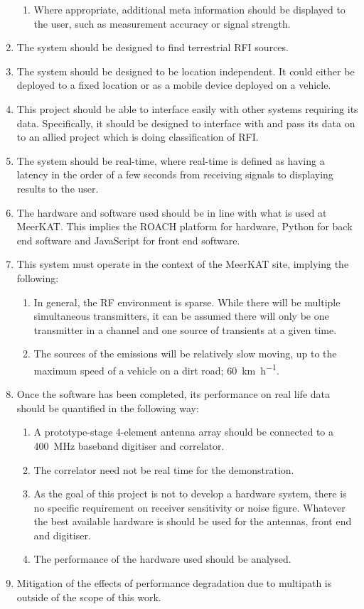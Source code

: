 \begin{enumerate}
\begin{enumerate}
      \item Where appropriate, additional meta information should be displayed to the user, such as measurement accuracy or signal strength.
    \end{enumerate}
  \item The system should be designed to find terrestrial RFI sources.
  \item The system should be designed to be location independent. It could either be deployed to a fixed location or as a mobile device deployed on a vehicle.
  \item This project should be able to interface easily with other systems requiring its data. Specifically, it should be designed to interface with and pass its data on to an allied project which is doing classification of RFI.
  \item The system should be real-time, where real-time is defined as having a latency in the order of a few seconds from receiving signals to displaying results to the user. 
  \item The hardware and software used should be in line with what is used at MeerKAT. This implies the ROACH platform for hardware, Python for back end software and JavaScript for front end software.  
  \item This system must operate in the context of the MeerKAT site, implying the following:
  \begin{enumerate}
      \item In general, the RF environment is sparse. While there will be multiple simultaneous transmitters, it can be assumed there will only be one transmitter in a channel and one source of transients at a given time.
      \item The sources of the emissions will be relatively slow moving, up to the maximum speed of a vehicle on a dirt road; \SI[per-mode=symbol]{60}{\kilo\metre\per\hour}.
  \end{enumerate}

  \item Once the software has been completed, its performance on real life data should be quantified in the following way:
    \begin{enumerate}
      \item A prototype-stage 4-element antenna array should be connected to a \SI{400}{\mega\hertz} baseband digitiser and correlator.
      \item The correlator need not be real time for the demonstration.
      \item As the goal of this project is not to develop a hardware system, there is no specific requirement on receiver sensitivity or noise figure. Whatever the best available hardware is should be used for the antennas, front end and digitiser. 
      \item The performance of the hardware used should be analysed. 
    \end{enumerate}
  \item Mitigation of the effects of performance degradation due to multipath is outside of the scope of this work.


\end{enumerate}
